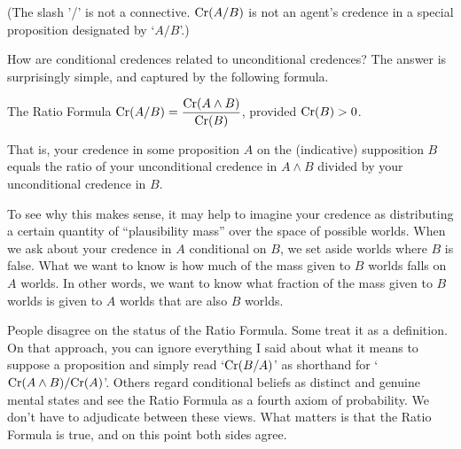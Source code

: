 (The slash '/' is not a connective. $\text{Cr}(A/B)$ is not an agent's credence in a
special proposition designated by `$A/B$'.)


How are conditional credences related to unconditional credences?
The answer is surprisingly simple, and captured by the following
formula.
\begin{genericthm}{The Ratio Formula}
  \leavevmode\vspace{-3mm}
  \quad\newline
  $\text{Cr}(A/B) = \dfrac{\text{Cr}(A \land B)}{\text{Cr}(B)}$, provided $\text{Cr}(B)>0$.
\end{genericthm}
That is, your credence in some proposition $A$ on the (indicative)
supposition $B$ equals the ratio of your unconditional
credence in $A \land B$ divided by your unconditional credence in $B$.

To see why this makes sense, it may help to imagine your credence as
distributing a certain quantity of ``plausibility mass'' over
the space of possible worlds. When we ask about your credence in
$A$ conditional on $B$, we set aside worlds where $B$ is false. What
we want to know is how much of the mass given to $B$ worlds falls on
$A$ worlds. In other words, we want to know what fraction of the mass
given to $B$ worlds is given to $A$ worlds that are also $B$ worlds.

People disagree on the status of the Ratio Formula. Some treat it as a
definition. On that approach, you can ignore everything I said about
what it means to suppose a proposition and simply read `$\text{Cr}(B/A)$' as
shorthand for `$\text{Cr}(A \land B)/\text{Cr}(A)$'. Others regard conditional
beliefs as distinct and genuine mental states and see the Ratio
Formula as a fourth axiom of probability. We
don't have to adjudicate between these views. What matters is that the
Ratio Formula is true, and on this point both sides agree.

